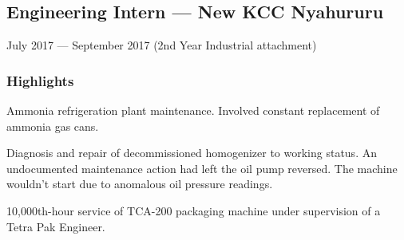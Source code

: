 \documentclass[a4paper,10pt]{article}
\begin{document}
\subsection{Engineering Intern --- New KCC Nyahururu}
July 2017 --- September 2017 (2nd Year Industrial attachment)
\subsubsection{Highlights}
Ammonia refrigeration plant maintenance. Involved constant replacement of ammonia gas cans.

Diagnosis and repair of decommissioned homogenizer to working status. An undocumented maintenance action had left the oil pump reversed. The machine wouldn't start due to anomalous oil pressure readings.

10,000th-hour service of TCA-200 packaging machine under supervision of a Tetra Pak Engineer.

\end{document}

